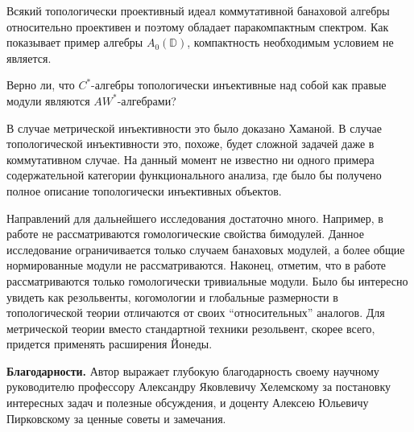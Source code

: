 Всякий топологически проективный идеал коммутативной банаховой алгебры относительно проективен и поэтому обладает паракомпактным спектром. Как показывает пример алгебры $A_0(\mathbb{D})$, компактность необходимым условием не является.

\begin{problem*} Верно ли, что $C^*$-алгебры топологически инъективные над собой как правые модули являются $AW^*$-алгебрами?
\end{problem*}

В случае метрической инъективности это было доказано Хаманой. В случае топологической инъективности это, похоже, будет сложной задачей даже в коммутативном случае. На данный момент не известно ни одного примера содержательной категории функционального анализа, где было бы получено полное описание топологически инъективных объектов.

Направлений для дальнейшего исследования достаточно много. Например, в работе не рассматриваются гомологические свойства бимодулей. Данное исследование ограничивается только случаем банаховых модулей, а более общие нормированные модули не рассматриваются. Наконец, отметим, что в работе рассматриваются только гомологически тривиальные модули. Было бы интересно увидеть как резольвенты, когомологии и глобальные размерности в топологической теории отличаются от своих ``относительных'' аналогов. Для метрической теории вместо стандартной техники резольвент, скорее всего, придется применять расширения Йонеды. 

\textbf{Благодарности.} Автор выражает глубокую благодарность своему научному руководителю профессору Александру Яковлевичу Хелемскому за постановку интересных задач и полезные обсуждения, и доценту Алексею Юльевичу Пирковскому за ценные советы и замечания.

\renewcommand{\refname}{\Large Публикации автора по теме диссертации}
\printbibliography[keyword=phdresult]